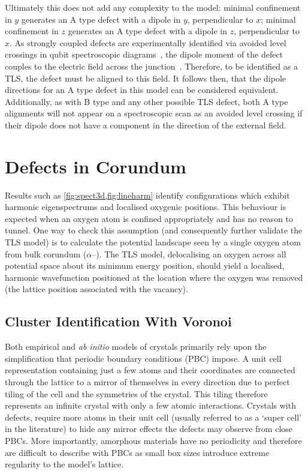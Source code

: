 Ultimately this does not add any complexity to the model: minimal confinement in $y$ generates an A type defect with a dipole in $y$, perpendicular to $x$; minimal confinement in $z$ generates an A type defect with a dipole in $z$, perpendicular to $x$.
As strongly coupled defects are experimentally identified via avoided level crossings in qubit spectroscopic diagrams~\cite{Lisenfeld2010}, the dipole moment of the defect couples to the electric field across the junction~\cite{Martinis2005}.
Therefore, to be identified as a TLS, the defect must be aligned to this field.
It follows then, that the dipole directions for an A type defect in this model can be considered equivalent.
Additionally, as with B type and any other possible TLS defect, both A type alignments will not appear on a spectroscopic scan as an avoided level crossing if their dipole does not have a component in the direction of the external field.

\section{Defects in Corundum}\label{sec:corundum}

Results such as \cref{fig:spect3d,fig:lineharm} identify configurations which exhibit harmonic eigenspectrums and localised oxygenic positions.
This behaviour is expected when an oxygen atom is confined appropriately and has no reason to tunnel.
One way to check this assumption (and consequently further validate the TLS model) is to calculate the potential landscape seen by a single oxygen atom from bulk corundum ($\alpha$--).
The TLS model, delocalising an oxygen across all potential space about its minimum energy position, should yield a localised, harmonic wavefunction positioned at the location where the oxygen was removed (\ie the lattice position associated with the vacancy).

\subsection{Cluster Identification With Voronoi}\label{sec:voronoi}

Both empirical and \textit{ab initio} models of crystals primarily rely upon the simplification that periodic boundary conditions (PBC) impose.
A unit cell representation containing just a few atoms and their coordinates are connected through the lattice to a mirror of themselves in every direction due to perfect tiling of the cell and the symmetries of the crystal.
This tiling therefore represents an infinite crystal with only a few atomic interactions.
Crystals with defects, require more atoms in their unit cell (usually referred to as a `super cell' in the literature) to hide any mirror effects the defects may observe from close PBCs.
More importantly, amorphous materials have no periodicity and therefore are difficult to describe with PBCs as small box sizes introduce extreme regularity to the model's lattice.

